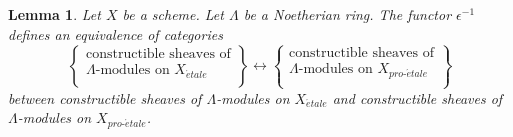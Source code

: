 \documentclass[10pt,a4paper]{article}
\theoremstyle{plain}
\newtheorem{lemma}[subsection]{Lemma}
\theoremstyle{definition}
\theoremstyle{remark}
\numberwithin{equation}{subsection}
\def\proetale{{pro\text{-}\acute{e}tale}}
\def\etale{{\acute{e}tale}}
\begin{document}
\begin{lemma}
\label{lemma-compare-constructible}
Let $X$ be a scheme. Let $\Lambda$ be a Noetherian ring.
The functor $\epsilon^{-1}$ defines an equivalence of categories
$$
\left\{
\begin{matrix}
\text{constructible sheaves of}\\
\Lambda\text{-modules on }X_\etale\\
\end{matrix}
\right\}
\longleftrightarrow
\left\{
\begin{matrix}
\text{constructible sheaves of}\\
\Lambda\text{-modules on }X_\proetale\\
\end{matrix}
\right\}
$$
between constructible sheaves of $\Lambda$-modules on $X_\etale$
and constructible sheaves of $\Lambda$-modules on $X_\proetale$.
\end{lemma}
\end{document}
